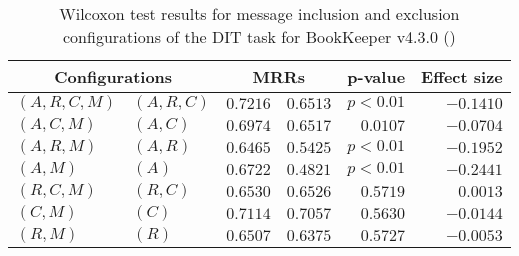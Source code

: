 
\begin{table}
\begin{spacing}{1.2}
\centering
\caption{Wilcoxon test results for message inclusion and exclusion configurations of the DIT task for BookKeeper v4.3.0 (\ctwo)}
\label{table:versus-wilcox-bookkeeper-dit-message}
\begin{tabular}{ll|rr|rr}
\toprule
      \multicolumn{2}{c|}{Configurations} &                \multicolumn{2}{c|}{MRRs} &        p-value & Effect size \\
\midrule
 $(A,R,C,M)$ &  $(A,R,C)$ &  $\bm{0.7216}$ &  $0.6513$ & $p<0.01$ &   $-0.1410$ \\
   $(A,C,M)$ &    $(A,C)$ &  $\bm{0.6974}$ &  $0.6517$ & $0.0107$ &   $-0.0704$ \\
   $(A,R,M)$ &    $(A,R)$ &  $\bm{0.6465}$ &  $0.5425$ & $p<0.01$ &   $-0.1952$ \\
     $(A,M)$ &      $(A)$ &  $\bm{0.6722}$ &  $0.4821$ & $p<0.01$ &   $-0.2441$ \\
   $(R,C,M)$ &    $(R,C)$ &  $\bm{0.6530}$ &  $0.6526$ & $0.5719$ &    $0.0013$ \\
     $(C,M)$ &      $(C)$ &  $\bm{0.7114}$ &  $0.7057$ & $0.5630$ &   $-0.0144$ \\
     $(R,M)$ &      $(R)$ &  $\bm{0.6507}$ &  $0.6375$ & $0.5727$ &   $-0.0053$ \\
\bottomrule
\end{tabular}

\end{spacing}
\end{table}

